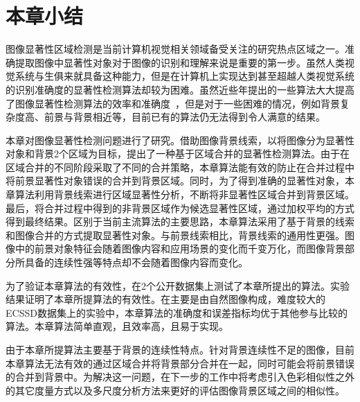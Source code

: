\section{本章小结}
图像显著性区域检测是当前计算机视觉相关领域备受关注的研究热点区域之一。准确提取图像中显著性对象对于图像的识别和理解来说是重要的第一步。虽然人类视觉系统与生俱来就具备这种能力，但是在计算机上实现达到甚至超越人类视觉系统的识别准确度的显著性检测算法却较为困难。虽然近些年提出的一些算法大大提高了图像显著性检测算法的效率和准确度~\cite{ChengPAMI,ufo,Yan2014Hierarchical,geodesicDistance}，但是对于一些困难的情况，例如背景复杂度高、前景与背景相近等，目前已有的算法仍无法得到令人满意的结果。\par
本章对图像显著性检测问题进行了研究。借助图像背景线索，以将图像分为显著性对象和背景2个区域为目标，提出了一种基于区域合并的显著性检测算法。由于在区域合并的不同阶段采取了不同的合并策略，本章算法能有效的防止在合并过程中将前景显著性对象错误的合并到背景区域。同时，为了得到准确的显著性对象，本章算法利用背景线索进行区域显著性分析，不断将非显著性区域合并到背景区域。最后，将合并过程中得到的非背景区域作为候选显著性区域，通过加权平均的方式得到最终结果。区别于当前主流算法的主要思路，本章算法采用了基于背景的线索和图像合并的方式提取显著性对象。与前景线索相比，背景线索的通用性更强。图像中的前景对象特征会随着图像内容和应用场景的变化而千变万化，而图像背景部分所具备的连续性强等特点却不会随着图像内容而变化。\par
为了验证本章算法的有效性，在2个公开数据集上测试了本章所提出的算法。实验结果证明了本章所提算法的有效性。在主要是由自然图像构成，难度较大的ECSSD数据集上的实验中，本章算法的准确度和误差指标均优于其他参与比较的算法。本章算法简单直观，且效率高，且易于实现。\par
由于本章所提算法主要基于背景的连续性特点。针对背景连续性不足的图像，目前本章算法无法有效的通过区域合并将背景部分合并在一起，同时可能会将前景错误的合并到背景中。为解决这一问题，在下一步的工作中将考虑引入色彩相似性之外的其它度量方式以及多尺度分析方法来更好的评估图像背景区域之间的相似性。
